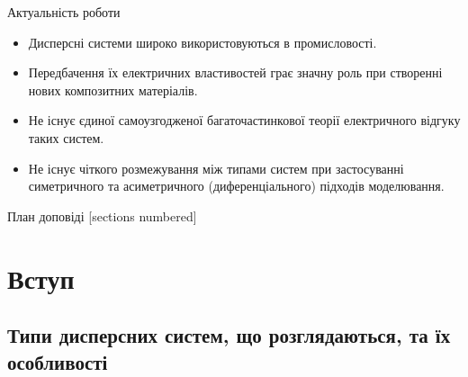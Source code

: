 \documentclass[10pt]{beamer}
\begin{document}
\begin{frame}{Актуальність роботи}

  \begin{itemize}
    \item Дисперсні системи широко використовуються в промисловості.
    \item Передбачення їх електричних властивостей грає значну роль при створенні нових композитних матеріалів.
    \item Не існує єдиної самоузгодженої багаточастинкової теорії електричного відгуку таких систем.
    \item Не існує чіткого розмежування між типами систем при застосуванні симетричного та асиметричного (диференціального) підходів моделювання.
  \end{itemize}

\end{frame}

\begin{frame}{План доповіді}
  \footnotesize
  [sections numbered]
  \tableofcontents%
  \vspace{-25pt}
\end{frame}


\section[Вступ]{Вступ}%
\subsection{Типи дисперсних систем, що розглядаються, та їх особливості}
\end{document}
